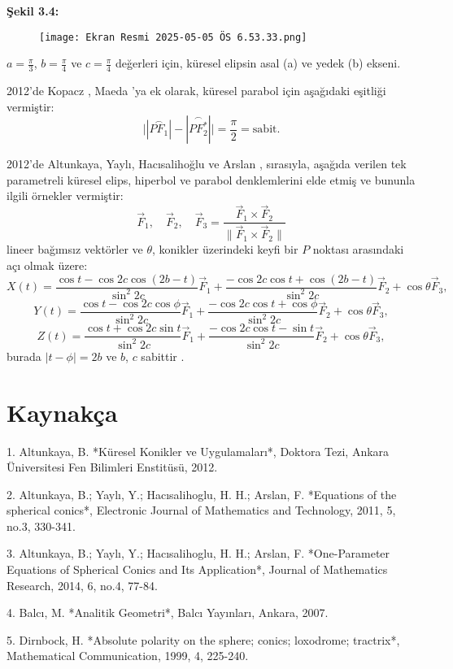 \documentclass[a4paper,12pt]{article}
\begin{document}
\textbf{Şekil 3.4:} 
\begin{figure}
    \centering
    \texttt{[image: Ekran Resmi 2025-05-05 ÖS 6.53.33.png]}
\end{figure}


$a = \frac{\pi}{3}$, $b = \frac{\pi}{4}$ ve $c = \frac{\pi}{4}$ değerleri için, küresel elipsin asal (a) ve yedek (b) ekseni.

2012'de Kopacz   , Maeda   'ya ek olarak, küresel parabol için aşağıdaki eşitliği vermiştir:
\[
\big||\overset{\frown}{PF_1}| - |\overset{\frown}{PF^*_2}|\big| = \frac{\pi}{2} = \text{sabit}.
\]

2012'de Altunkaya, Yaylı, Hacısalihoğlu ve Arslan   , sırasıyla, aşağıda verilen tek parametreli küresel elips, hiperbol ve parabol denklemlerini elde etmiş ve bununla ilgili örnekler vermiştir:
\[
\vec{F}_1, \quad \vec{F}_2, \quad \vec{F}_3 = \frac{\vec{F}_1 \times \vec{F}_2}{\|\vec{F}_1 \times \vec{F}_2\|}
\]
lineer bağımsız vektörler ve $\theta$, konikler üzerindeki keyfi bir $P$ noktası arasındaki açı olmak üzere:
\[
X(t) = \frac{\cos t - \cos 2c \cos(2b - t)}{\sin^2 2c} \vec{F}_1 + \frac{-\cos 2c \cos t + \cos(2b - t)}{\sin^2 2c} \vec{F}_2 + \cos \theta \vec{F}_3,
\]
\[
Y(t) = \frac{\cos t - \cos 2c \cos \phi}{\sin^2 2c} \vec{F}_1 + \frac{-\cos 2c \cos t + \cos \phi}{\sin^2 2c} \vec{F}_2 + \cos \theta \vec{F}_3,
\]
\[
Z(t) = \frac{\cos t + \cos 2c \sin t}{\sin^2 2c} \vec{F}_1 + \frac{-\cos 2c \cos t - \sin t}{\sin^2 2c} \vec{F}_2 + \cos \theta \vec{F}_3,
\]
burada $|t - \phi| = 2b$ ve $b$, $c$ sabittir   .

\section*{Kaynakça}

1. Altunkaya, B. *Küresel Konikler ve Uygulamaları*, Doktora Tezi, Ankara Üniversitesi Fen Bilimleri Enstitüsü, 2012.

2. Altunkaya, B.; Yaylı, Y.; Hacısalihoglu, H. H.; Arslan, F. *Equations of the spherical conics*, Electronic Journal of Mathematics and Technology, 2011, 5, no.3, 330-341.

3. Altunkaya, B.; Yaylı, Y.; Hacısalihoglu, H. H.; Arslan, F. *One-Parameter Equations of Spherical Conics and Its Application*, Journal of Mathematics Research, 2014, 6, no.4, 77-84.

4. Balcı, M. *Analitik Geometri*, Balcı Yayınları, Ankara, 2007.

5. Dirnbock, H. *Absolute polarity on the sphere; conics; loxodrome; tractrix*, Mathematical Communication, 1999, 4, 225-240.
\end{document}
